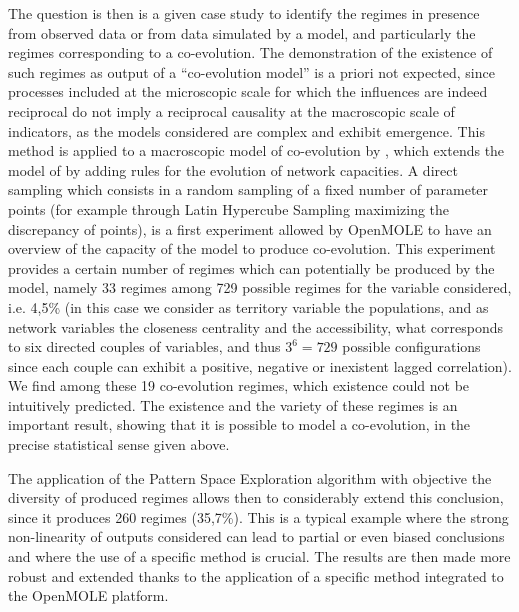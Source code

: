 \documentclass[10pt]{article}
\begin{document}
The question is then is a given case study to identify the regimes in presence from observed data or from data simulated by a model, and particularly the regimes corresponding to a co-evolution. The demonstration of the existence of such regimes as output of a ``co-evolution model'' is a priori not expected, since processes included at the microscopic scale for which the influences are indeed reciprocal do not imply a reciprocal causality at the macroscopic scale of indicators, as the models considered are complex and exhibit emergence. This method is applied to a macroscopic model of co-evolution by \cite{raimbault2018modeling}, which extends the model of \citep{raimbault2018indirect} by adding rules for the evolution of network capacities. A direct sampling which consists in a random sampling of a fixed number of parameter points (for example through Latin Hypercube Sampling maximizing the discrepancy of points), is a first experiment allowed by OpenMOLE to have an overview of the capacity of the model to produce co-evolution. This experiment provides a certain number of regimes which can potentially be produced by the model, namely 33 regimes among 729 possible regimes for the variable considered, i.e. 4,5\% (in this case we consider as territory variable the populations, and as network variables the closeness centrality and the accessibility, what corresponds to six directed couples of variables, and thus $3^6=729$ possible configurations since each couple can exhibit a positive, negative or inexistent lagged correlation). We find among these 19 co-evolution regimes, which existence could not be intuitively predicted. The existence and the variety of these regimes is an important result, showing that it is possible to model a co-evolution, in the precise statistical sense given above.



The application of the Pattern Space Exploration algorithm \citep{10.1371/journal.pone.0138212} with objective the diversity of produced regimes allows then to considerably extend this conclusion, since it produces 260 regimes (35,7\%). This is a typical example where the strong non-linearity of outputs considered can lead to partial or even biased conclusions and where the use of a specific method is crucial. The results are then made more robust and extended thanks to the application of a specific method integrated to the OpenMOLE platform.
\end{document}

